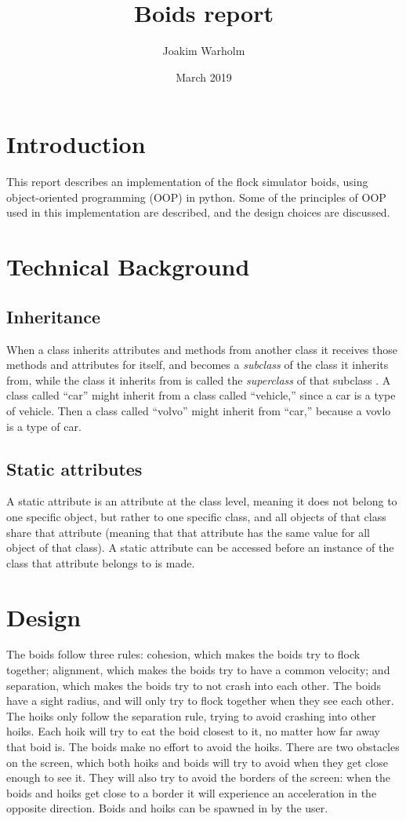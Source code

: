 \documentclass{article}
\title{Boids report}
\author{Joakim Warholm}
\date{March 2019}
\begin{document}
\maketitle
\section{Introduction}
This report describes an implementation of the flock simulator boids, using object-oriented programming (OOP) in python. Some of the principles of OOP used in this implementation are described, and the design choices are discussed.

\section{Technical Background}
\subsection{Inheritance}
When a class inherits attributes and methods from another class it receives those methods and attributes for itself, and becomes a \emph{subclass} of the class it inherits from, while the class it inherits from is called the \emph{superclass} of that subclass \cite[p.60]{PhillipsDusty2010P3oo}. A class called ``car'' might inherit from a class called ``vehicle,'' since a car is a type of vehicle. Then a class called ``volvo'' might inherit from ``car,'' because a vovlo is a type of car. 

\subsection{Static attributes}
A static attribute is an attribute at the class level, meaning it does not belong to one specific object, but rather to one specific class, and all objects of that class share that attribute (meaning that that attribute has the same value for all object of that class). A static attribute can be accessed before an instance of the class that attribute belongs to is made. 

\section{Design}
The boids follow three rules: cohesion, which makes the boids try to flock together; alignment, which makes the boids try to have a common velocity; and separation, which makes the boids try to not crash into each other. The boids have a sight radius, and will only try to flock together when they see each other. The hoiks only follow the separation rule, trying to avoid crashing into other hoiks. Each hoik will try to eat the boid closest to it, no matter how far away that boid is. The boids make no effort to avoid the hoiks. There are two obstacles on the screen, which both hoiks and boids will try to avoid when they get close enough to see it. They will also try to avoid the borders of the screen: when the boids and hoiks get close to a border it will experience an acceleration in the opposite direction. Boids and hoiks can be spawned in by the user. 
\end{document}
